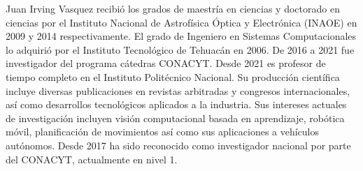 Juan Irving Vasquez recibió los grados de maestría en ciencias y doctorado en ciencias por el Instituto Nacional de Astrofísica Óptica y Electrónica (INAOE) en 2009 y 2014 respectivamente. El grado de Ingeniero en Sistemas Computacionales lo adquirió por el Instituto Tecnológico de Tehuacán en 2006. De 2016 a 2021 fue investigador del programa cátedras CONACYT. Desde 2021 es profesor de tiempo completo en el Instituto Politécnico Nacional. Su producción científica incluye diversas publicaciones en revistas arbitradas y congresos internacionales, así como desarrollos tecnológicos aplicados a la industria. Sus intereses actuales de investigación incluyen visión computacional basada en aprendizaje, robótica móvil, planificación de movimientos así como sus aplicaciones a vehículos autónomos. Desde 2017 ha sido reconocido como investigador nacional por parte del CONACYT, actualmente en nivel 1.